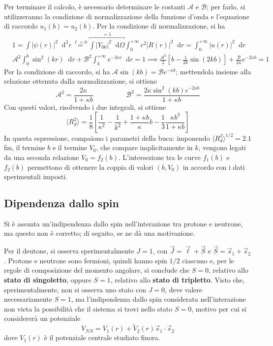 \documentclass[11pt, a4paper]{scrartcl}
\theoremstyle{style}
\newcommand{\dd}{\mathop{}\!\mathrm{d}}
\numberwithin{equation}{subsection}
\begin{document}
Per terminare il calcolo, \`e necessario determinare le costanti $\mathcal{A} $ e $\mathcal{B} $; per farlo, si utilizzeranno la condizione di normalizzazione della funzione d'onda e l'equazione di raccordo $u_1(b) = u_2(b)$.
Per la condizione di normalizzazione, si ha
\[
\begin{split}
	&1 = \int \lvert \psi (r) \rvert ^2 \dd^3 r \stackrel{\ell =0}{=} \overbracket{\int \lvert Y_{00} \rvert ^2 \dd \Omega }^{=1} \int _0^{+\infty} r^2 \lvert R(r) \rvert ^2 \dd r = \int _0^{+\infty} \lvert u(r) \rvert ^2 \dd r\\
	& \mathcal{A} ^2 \int _0^b \sin^2 (kr) \dd r + \mathcal{B} ^2 \int _b^{+\infty} e^{-2\kappa r} \dd r = 1 \implies \frac{\mathcal{A} ^2}{2} \left[ b - \frac{1}{2k}\sin (2kb) \right] + \frac{\mathcal{B} }{2\kappa }e^{-2\kappa b} =1
\end{split}
\] 
Per la condizione di raccordo, si ha $\mathcal{A}  \sin(kb) = \mathcal{B} e^{-\kappa b}$; mettendola insieme alla relazione ottenuta dalla normalizzazione, si ottiene
\begin{equation}
	\mathcal{A} ^2 = \frac{2\kappa }{1+\kappa b} \hspace{2cm} \mathcal{B} ^2 = \frac{2\kappa  \sin^2 (kb) e^{-2\kappa b}}{1 + \kappa b}
\end{equation}
Con questi valori, risolvendo i due integrali, si ottiene
\begin{equation}
	\langle R_d^2 \rangle = \frac{1}{8} \left[ \frac{1}{\kappa ^2} - \frac{1}{k^2} + \frac{1 + \kappa b}{\kappa }b - \frac{1}{3} \frac{\kappa b^3}{1 + \kappa b}\right] 
\end{equation}
In questa espressione, compaiono i parametri della buca: imponendo $\langle R_d^2 \rangle^{1 / 2} = 2.1$ fm, il termine $b$ e il termine $V_0$, che compare implicitamente in $k$, vengono legati da una seconda relazione $V_0 = f_2(b)$.
L'intersezione tra le curve $f_1(b)$ e $f_2(b)$ permettono di ottenere la coppia di valori $(b,V_0)$ in accordo con i dati sperimentali imposti.

\subsection{Dipendenza dallo spin}
Si \`e assunta un'indipendenza dallo spin nell'interazione tra protone e neutrone, ma questo non \`e corretto; di seguito, se ne d\`a una motivazione.

Per il deutone, si osserva sperimentalmente $J=1$, con $\vec{J} = \vec{\ell } + \vec{S}$ e $\vec{S} = \vec{s}_1 + \vec{s}_2$.
Protone e neutrone sono fermioni, quindi hanno spin $1 / 2$ ciascuno e, per le regole di composizione del momento angolare, si conclude che $S = 0$, relativo allo \textbf{stato di singoletto}, oppure $S=1$, relativo allo \textbf{stato di tripletto}.
Visto che, sperimentalmente, non si osserva uno stato con $J=0$, deve valere necessariamente $S=1$, ma l'indipendenza dallo spin considerata nell'interazione non vieta la possibilit\`a che il sistema si trovi nello stato $S=0$, motivo per cui si considerer\`a un potenziale
\[
V_{NN} = V_1(r) + \tilde{V}_2(r) \vec{s}_1 \cdot \vec{s}_2
\] 
dove $V_1(r)$ \`e il potenziale centrale studiato finora.
\end{document}
